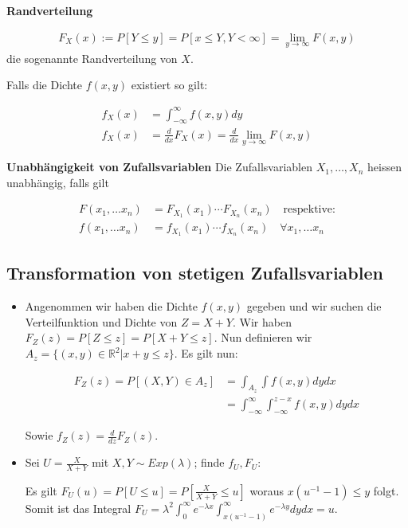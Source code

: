 \documentclass[25pt]{sciposter}
\newcommand{\R}{\mathbb{R}}
\newenvironment{method}[1]{\begin{mdframed}[backgroundcolor=blue!10,innertopmargin=15pt, innerbottommargin=15pt,nobreak=true]
		\textbf{#1 }
	}
	{ 
	\end{mdframed}
}
\begin{document}
\begin{multicols}{3}
\begin{method}{Randverteilung}
	\begin{align*}
	F_X(x) := P[Y \leq y] = P[x\leq Y, Y < \infty] = \lim_{y \to \infty} F(x,y)
	\end{align*}
	die sogenannte Randverteilung von $X$.
	
	Falls die Dichte $f(x,y)$ existiert so gilt:
	
	\begin{align*}
	f_X(x) &= \int_{-\infty}^{\infty}f(x,y) dy\\
	f_X(x) &= \frac{d}{dx}F_X(x) = \frac{d}{dx}\lim_{y \to \infty} F(x,y)
	\end{align*}
	
\end{method}

\begin{method}{Unabhängigkeit von Zufallsvariablen} Die Zufallsvariablen $X_1,\ldots, X_n$ heissen unabhängig, falls gilt
	
	\begin{align*}
	F(x_1,\ldots x_n) &= F_{X_1}(x_1) \cdots F_{X_n}(x_n) \quad \text{respektive:}\\
	f(x_1,\ldots x_n) &= f_{X_1}(x_1) \cdots f_{X_n}(x_n) \quad \forall x_1,\ldots x_n
	\end{align*}
\end{method}


\subsection*{Transformation von stetigen Zufallsvariablen}
\begin{itemize}
	\item Angenommen wir haben die Dichte $f(x,y)$ gegeben und wir suchen die Verteilfunktion und Dichte von $Z = X + Y$. Wir haben $F_Z(z) = P[Z \leq z] = P[X+Y\leq z]$. Nun definieren wir $A_z = \{(x,y)\in\R^2|x+y\leq z\}$. Es gilt nun:
	
	\begin{align*}
	F_Z(z) = P[(X,Y)\in A_z] &= \int_{A_z} \int f(x,y) dy dx\\
	&= \int_{-\infty}^{\infty} \int_{-\infty}^{z-x} f(x,y) dy dx
	\end{align*}
	
	Sowie $f_Z(z) = \frac{d}{dz} F_Z(z)$.
	
	
\item Sei $U = \frac{X}{X+Y}$ mit $X,Y\sim Exp(\lambda)$; finde $f_U, F_U$:

Es gilt $F_U(u) = P[U \leq u] = P[\frac{X}{X+Y}\leq u]$ woraus $x(u^{-1} -1)\leq y$ folgt.
Somit ist das Integral $F_U = \lambda^2 \int_{0}^{\infty} e^{-\lambda x} \int_{x(u^{-1} -1)}^{\infty} e^{-\lambda y} dy dx = u$.


\end{itemize}
\end{multicols}
\end{document}
